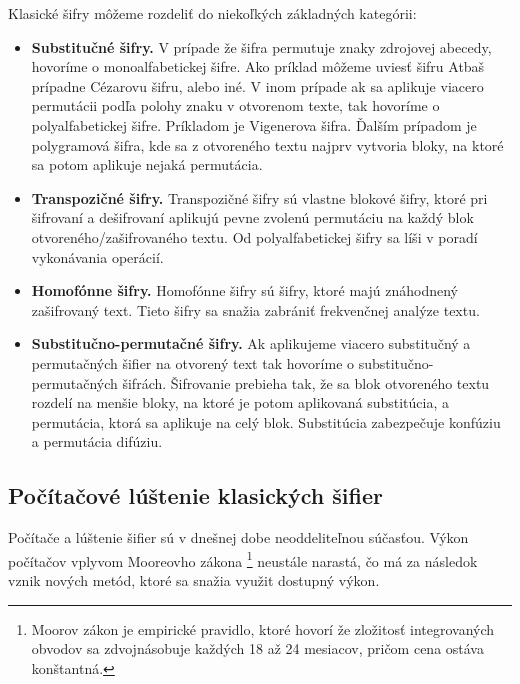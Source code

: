 Klasické šifry môžeme rozdeliť do niekoľkých základných kategórii:
\begin{itemize}

\item \textbf{Substitučné šifry.}
  V prípade že šifra permutuje znaky zdrojovej abecedy, hovoríme o monoalfabetickej šifre.
  Ako príklad môžeme uviesť šifru Atbaš prípadne Cézarovu šifru, alebo iné.
  V inom prípade ak sa aplikuje viacero permutácii podľa polohy znaku v otvorenom texte, tak hovoríme o polyalfabetickej šifre.
  Príkladom je Vigenerova šifra. Ďalším prípadom je polygramová šifra, kde sa z otvoreného textu najprv vytvoria bloky,
  na ktoré sa potom aplikuje nejaká permutácia.

\item \textbf{Transpozičné šifry.}
  Transpozičné šifry sú vlastne blokové šifry, ktoré pri šifrovaní a dešifrovaní aplikujú pevne zvolenú permutáciu na každý blok
  otvoreného/zašifrovaného textu. Od polyalfabetickej šifry sa líši v poradí vykonávania operácií.
  
\item \textbf{Homofónne šifry.}
  Homofónne šifry sú šifry, ktoré majú znáhodnený zašifrovaný text. Tieto šifry sa snažia zabrániť frekvenčnej analýze textu. 
  
\item \textbf{Substitučno-permutačné šifry.}
  Ak aplikujeme viacero substitučný a permutačných šifier na otvorený text tak hovoríme o substitučno-permutačných šifrách.
  Šifrovanie prebieha tak, že sa blok otvoreného textu rozdelí na menšie bloky, na ktoré je potom aplikovaná substitúcia, a permutácia,
  ktorá sa aplikuje na celý blok. Substitúcia zabezpečuje konfúziu a permutácia difúziu.
  
\end{itemize}

\subsection{Počítačové lúštenie klasických šifier}
Počítače a lúštenie šifier sú v dnešnej dobe neoddeliteľnou súčasťou. Výkon počítačov vplyvom Mooreovho zákona \footnote{Moorov zákon je empirické pravidlo, ktoré hovorí že zložitosť integrovaných obvodov sa zdvojnásobuje každých 18 až 24 mesiacov, pričom cena ostáva konštantná.} neustále narastá,
čo má za následok vznik nových metód, ktoré sa snažia využit dostupný výkon.

